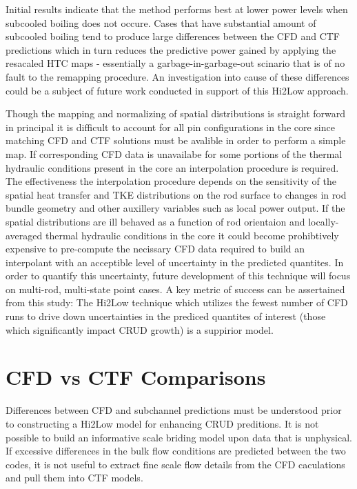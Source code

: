 Initial results indicate that the method performs best at lower power levels when subcooled boiling does not occure.  Cases that have substantial amount of subcooled boiling tend to produce large differences between the CFD and CTF predictions which in turn reduces the predictive power gained by applying the resacaled HTC maps - essentially a garbage-in-garbage-out scinario that is of no fault to the remapping procedure.  An investigation into cause of these differences could be a subject of future work conducted in support of this Hi2Low approach.  

Though the mapping and normalizing of spatial distributions is straight forward in principal it is difficult to account for all pin configurations in the core since matching CFD and CTF solutions must be avalible in order to perform a simple map.  If corresponding CFD data is unavailabe for some portions of the thermal hydraulic conditions present in the core an interpolation procedure is required.  The effectiveness the interpolation procedure depends on the sensitivity of the spatial heat transfer and TKE distributions on the rod surface to changes in rod bundle geometry and other auxillery variables such as local power output.  If the spatial distributions are ill behaved as a function of rod orientaion and locally-averaged thermal hydraulic conditions in the core it could become prohibtively expensive to pre-compute the necissary CFD data required to build an interpolant with an acceptible level of uncertainty in the predicted quantites.  In order to quantify this uncertainty, future development of this technique will focus on multi-rod, multi-state point cases.
A key metric of success can be assertained from this study:  The Hi2Low technique which utilizes the fewest number of CFD runs to drive down uncertainties in the prediced quantites of interest (those which significantly impact CRUD growth) is a suppirior model.

\section{CFD vs CTF Comparisons}

Differences between CFD and subchannel predictions must be understood prior to constructing a Hi2Low model for enhancing CRUD preditions.  It is not possible to build an informative scale briding model upon data that is unphysical.  If excessive differences in the bulk flow conditions are predicted between the two codes, it is not useful to extract fine scale flow details from the CFD caculations and pull them into CTF models. 

